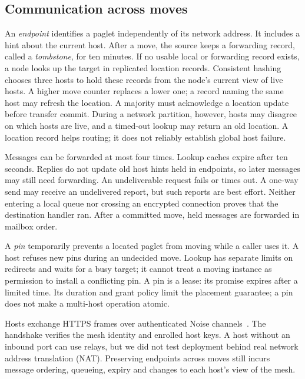 
\subsection{Communication across moves}\label{sec:communication}

An \emph{endpoint} identifies a paglet independently of its network
address. It includes a hint about the current host. After a move, the
source keeps a forwarding record, called a \emph{tombstone}, for ten
minutes. If no usable local or forwarding record exists, a node looks
up the target in replicated location records. Consistent
hashing~\cite{karger1997consistent} chooses three hosts to hold these
records from the node's current view of live hosts. A higher move counter
replaces a lower one; a record naming the same host may refresh the
location. A majority must acknowledge a location update before transfer
commit. During a network partition, however, hosts may disagree on which
hosts are live, and a timed-out lookup may return an old location.
A location record helps routing; it does not reliably establish global
host failure.

Messages can be forwarded at most four times. Lookup caches expire after
ten seconds. Replies do not update old host hints held in endpoints, so
later messages may still need forwarding. An undeliverable request fails
or times out. A one-way send may receive an undelivered report, but such
reports are best effort. Neither entering a local queue nor crossing an
encrypted connection proves that the destination handler ran. After a
committed move, held messages are forwarded in mailbox order.

A \emph{pin} temporarily prevents a located paglet from moving while a
caller uses it. A host refuses new pins during an undecided move. Lookup
has separate limits on redirects and waits for a busy target; it cannot
treat a moving instance as permission to install a conflicting pin.
A pin is a lease: its promise expires after a limited time.
Its duration and grant policy limit the placement guarantee; a pin does not make a multi-host operation atomic.

Hosts exchange HTTPS frames over authenticated Noise
channels~\cite{perrin2018noise}. The handshake verifies the mesh identity
and enrolled host keys. A host without an inbound port can use relays,
but we did not test deployment behind real network address translation
(NAT). Preserving endpoints across moves still incurs message ordering,
queueing, expiry and changes to each host's view of the mesh.
